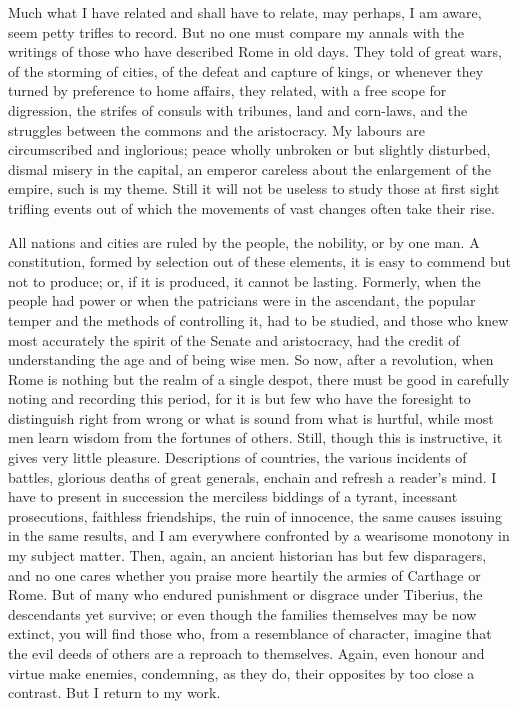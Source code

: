 
Much what I have related and shall have to relate, may perhaps, I am aware, seem petty trifles to record. But no one must compare my annals with the writings of those who have described Rome in old days. They told of great wars, of the storming of cities, of the defeat and capture of kings, or whenever they turned by preference to home affairs, they related, with a free scope for digression, the strifes of consuls with tribunes, land and corn-laws, and the struggles between the commons and the aristocracy. My labours are circumscribed and inglorious; peace wholly unbroken or but slightly disturbed, dismal misery in the capital, an emperor careless about the enlargement of the empire, such is my theme. Still it will not be useless to study those at first sight trifling events out of which the movements of vast changes often take their rise.


All nations and cities are ruled by the people, the nobility, or by one man. A constitution, formed by selection out of these elements, it is easy to commend but not to produce; or, if it is produced, it cannot be lasting. Formerly, when the people had power or when the patricians were in the ascendant, the popular temper and the methods of controlling it, had to be studied, and those who knew most accurately the spirit of the Senate and aristocracy, had the credit of understanding the age and of being wise men. So now, after a revolution, when Rome is nothing but the realm of a single despot, there must be good in carefully noting and recording this period, for it is but few who have the foresight to distinguish right from wrong or what is sound from what is hurtful, while most men learn wisdom from the fortunes of others. Still, though this is instructive, it gives very little pleasure. Descriptions of countries, the various incidents of battles, glorious deaths of great generals, enchain and refresh a reader's mind. I have to present in succession the merciless biddings of a tyrant, incessant prosecutions, faithless friendships, the ruin of innocence, the same causes issuing in the same results, and I am everywhere confronted by a wearisome monotony in my subject matter. Then, again, an ancient historian has but few disparagers, and no one cares whether you praise more heartily the armies of Carthage or Rome. But of many who endured punishment or disgrace under Tiberius, the descendants yet survive; or even though the families themselves may be now extinct, you will find those who, from a resemblance of character, imagine that the evil deeds of others are a reproach to themselves. Again, even honour and virtue make enemies, condemning, as they do, their opposites by too close a contrast. But I return to my work.

